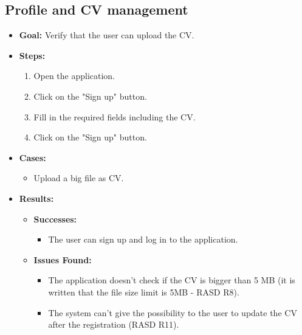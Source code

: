\subsection{Profile and CV management}
\begin{itemize}
    \item \textbf{Goal:} Verify that the user can upload the CV.

    \item \textbf{Steps:}
    \begin{enumerate}
        \item Open the application.
        \item Click on the "Sign up" button.
        \item Fill in the required fields including the CV.
        \item Click on the "Sign up" button.
    \end{enumerate}
    \item \textbf{Cases:}
    \begin{itemize}
        \item Upload a big file as CV.
    \end{itemize}
    \item \textbf{Results:}
    \begin{itemize}
        \item \textbf{Successes:}
        \begin{itemize}
            \item The user can sign up and log in to the application.
        \end{itemize}
        \item \textbf{Issues Found:}
        \begin{itemize}
            \item The application doesn't check if the CV is bigger than 5 MB (it is written that the file size limit is 5MB - RASD R8).
            \item The system can't give the possibility to the user to update the CV after the registration (RASD R11).
        \end{itemize}
    \end{itemize}
\end{itemize}

